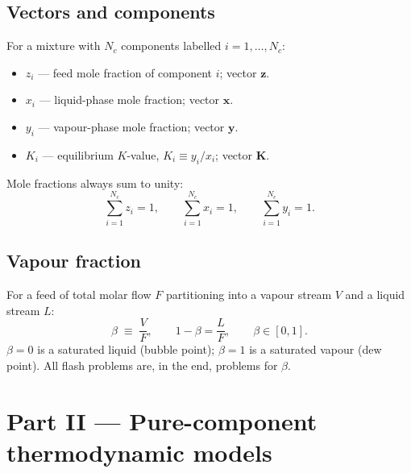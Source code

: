 \documentclass[11pt,a4paper]{article}
\newcommand{\xv}{\mathbf{x}}
\newcommand{\yv}{\mathbf{y}}
\newcommand{\zv}{\mathbf{z}}
\newcommand{\Kv}{\mathbf{K}}
\begin{document}
\subsection{Vectors and components}

For a mixture with $N_c$ components labelled $i = 1, \dots, N_c$:

\begin{itemize}[leftmargin=*,nosep]
  \item $z_i$ --- feed mole fraction of component $i$; vector $\zv$.
  \item $x_i$ --- liquid-phase mole fraction; vector $\xv$.
  \item $y_i$ --- vapour-phase mole fraction; vector $\yv$.
  \item $K_i$ --- equilibrium $K$-value, $K_i \equiv y_i / x_i$; vector $\Kv$.
\end{itemize}

Mole fractions always sum to unity:
\[
   \sum_{i=1}^{N_c} z_i = 1, \qquad
   \sum_{i=1}^{N_c} x_i = 1, \qquad
   \sum_{i=1}^{N_c} y_i = 1.
\]

\subsection{Vapour fraction}

For a feed of total molar flow $F$ partitioning into a vapour stream $V$
and a liquid stream $L$:
\begin{equation}
   \beta \;\equiv\; \frac{V}{F},  \qquad  1 - \beta = \frac{L}{F}, \qquad \beta \in [0, 1].
   \label{eq:beta-def}
\end{equation}
$\beta = 0$ is a saturated liquid (bubble point); $\beta = 1$ is a
saturated vapour (dew point). All flash problems are, in the end,
problems for $\beta$.


\clearpage
\section*{Part II --- Pure-component thermodynamic models}
{}
\end{document}
